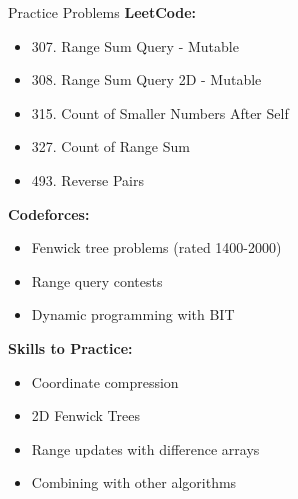 \documentclass[aspectratio=169]{beamer}
\begin{document}
\begin{frame}{Practice Problems}
  \textbf{LeetCode:}
  \begin{itemize}
    \item 307. Range Sum Query - Mutable
    \item 308. Range Sum Query 2D - Mutable
    \item 315. Count of Smaller Numbers After Self
    \item 327. Count of Range Sum
    \item 493. Reverse Pairs
  \end{itemize}

  \vspace{0.5cm}
  \textbf{Codeforces:}
  \begin{itemize}
    \item Fenwick tree problems (rated 1400-2000)
    \item Range query contests
    \item Dynamic programming with BIT
  \end{itemize}

  \vspace{0.5cm}
  \textbf{Skills to Practice:}
  \begin{itemize}
    \item Coordinate compression
    \item 2D Fenwick Trees
    \item Range updates with difference arrays
    \item Combining with other algorithms
  \end{itemize}
\end{frame}
\end{document}
